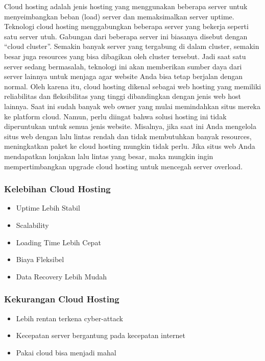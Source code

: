 \documentclass[conference]{IEEEtran}
\begin{document}
    Cloud hosting adalah jenis hosting yang menggunakan beberapa server untuk menyeimbangkan beban (load) server dan memaksimalkan server uptime.
    Teknologi cloud hosting menggabungkan beberapa server yang bekerja seperti satu server utuh. Gabungan dari beberapa server ini biasanya disebut dengan “cloud cluster”.
    Semakin banyak server yang tergabung di dalam cluster, semakin besar juga resources yang bisa dibagikan oleh cluster tersebut. 
    Jadi saat satu server sedang bermasalah, teknologi ini akan memberikan sumber daya dari server lainnya untuk menjaga agar website Anda bisa tetap berjalan dengan normal.
    Oleh karena itu, cloud hosting dikenal sebagai web hosting yang memiliki reliabilitas dan fleksibilitas yang tinggi dibandingkan dengan jenis web host lainnya.
    Saat ini sudah banyak web owner yang mulai memindahkan situs mereka ke platform cloud. Namun, perlu diingat bahwa solusi hosting ini tidak diperuntukan untuk semua jenis website.
    Misalnya, jika saat ini Anda mengelola situs web dengan lalu lintas rendah dan tidak membutuhkan banyak resources, meningkatkan paket ke cloud hosting mungkin tidak perlu.
    Jika situs web Anda mendapatkan lonjakan lalu lintas yang besar, maka mungkin ingin mempertimbangkan upgrade cloud hosting untuk mencegah server overload.
    \vspace{0.2cm}
    \subsubsection{Kelebihan Cloud Hosting}
      \begin{itemize}
        \item Uptime Lebih Stabil
        \item Scalability
        \item Loading Time Lebih Cepat
        \item Biaya Fleksibel
        \item Data Recovery Lebih Mudah
      \end{itemize}
      \vspace{0.2cm}
      \subsubsection{Kekurangan Cloud Hosting}
      \begin{itemize}
        \item Lebih rentan terkena cyber-attack
        \item Kecepatan server bergantung pada kecepatan internet
        \item Pakai cloud bisa menjadi mahal
      \end{itemize}
    
\end{document}
